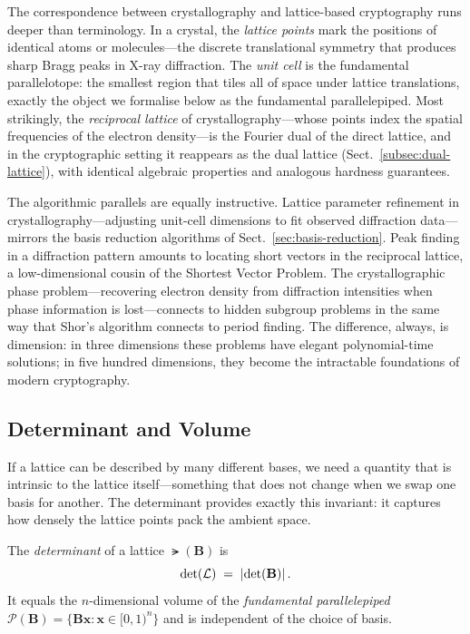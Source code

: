 The correspondence between crystallography and lattice-based cryptography runs deeper than terminology.  In a crystal, the \emph{lattice points} mark the positions of identical atoms or molecules---the discrete translational symmetry that produces sharp Bragg peaks in X-ray diffraction.  The \emph{unit cell} is the fundamental parallelotope: the smallest region that tiles all of space under lattice translations, exactly the object we formalise below as the fundamental parallelepiped.  Most strikingly, the \emph{reciprocal lattice} of crystallography---whose points index the spatial frequencies of the electron density---is the Fourier dual of the direct lattice, and in the cryptographic setting it reappears as the dual lattice (Sect.~\ref{subsec:dual-lattice}), with identical algebraic properties and analogous hardness guarantees.

The algorithmic parallels are equally instructive.  Lattice parameter refinement in crystallography---adjusting unit-cell dimensions to fit observed diffraction data---mirrors the basis reduction algorithms of Sect.~\ref{sec:basis-reduction}.  Peak finding in a diffraction pattern amounts to locating short vectors in the reciprocal lattice, a low-dimensional cousin of the Shortest Vector Problem.  The crystallographic phase problem---recovering electron density from diffraction intensities when phase information is lost---connects to hidden subgroup problems in the same way that Shor's algorithm connects to period finding.  The difference, always, is dimension: in three dimensions these problems have elegant polynomial-time solutions; in five hundred dimensions, they become the intractable foundations of modern cryptography.


\subsection{Determinant and Volume}
\label{subsec:determinant}

If a lattice can be described by many different bases, we need a quantity that is intrinsic to the lattice itself---something that does not change when we swap one basis for another.  The determinant provides exactly this invariant: it captures how densely the lattice points pack the ambient space.

\begin{definition}
\label{def:determinant}
The \emph{determinant} of a lattice $\lat(\mathbf{B})$ is
\begin{equation}
\det(\mathcal{L}) \;=\; \left\lvert \det(\mathbf{B}) \right\rvert.
\end{equation}
It equals the $n$-dimensional volume of the \emph{fundamental parallelepiped}
$\mathcal{P}(\mathbf{B}) = \bigl\{\mathbf{B}\mathbf{x} : \mathbf{x}\in[0,1)^n\bigr\}$
and is independent of the choice of basis.
\end{definition}

